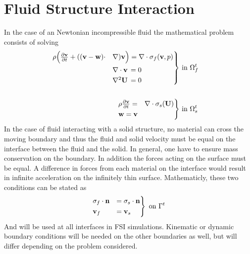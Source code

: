\section{Fluid Structure Interaction}
In the case of an Newtonian incompressible fluid the mathematical problem consists of solving
\begin{align}
\begin{rcases}
\rho \Big{(} \frac{\partial \mathbf{v}}{\partial t} + ((\mathbf{v}-\mathbf{w})  \cdot & \nabla )  \mathbf{v} \Big{)}  =   \nabla \cdot \sigma_f(\mathbf{v},p)  \\
& \nabla \cdot \mathbf{v} \, = 0 \\
& \nabla ^2 \mathbf{U} \, = 0
\end{rcases}
& \text{ in } \Omega_f^t \\ \\
\begin{rcases}
\rho \frac{\partial \mathbf{v}}{\partial t}  = &  \nabla \cdot \sigma_s(\mathbf{U}) \\
\mathbf{w} =  \mathbf{v}
\end{rcases}& \text{ in } \Omega_s^t 
\end{align}
In the case of fluid interacting with a solid structure, no material can cross the moving boundary and thus the fluid and solid velocity must be equal on the interface between the fluid and the solid. In general, one have to ensure mass conservation on the boundary. In addition the forces acting on the surface must be equal. A difference in forces from each material on the interface would result in infinite acceleration on the infinitely thin surface. Mathematicly, these two conditions can be stated as
\begin{align}
\begin{rcases}
\sigma_f \cdot \mathbf{n} & =  \sigma_s \cdot \mathbf{n} \\
\mathbf{v}_f & = \mathbf{v}_s
\end{rcases}
\text{ on } \Gamma^t
\end{align}
And will be used at all interfaces in FSI simulations. Kinematic or dynamic boundary conditions will be needed on the other boundaries as well, but will differ depending on the problem considered. 
\\


